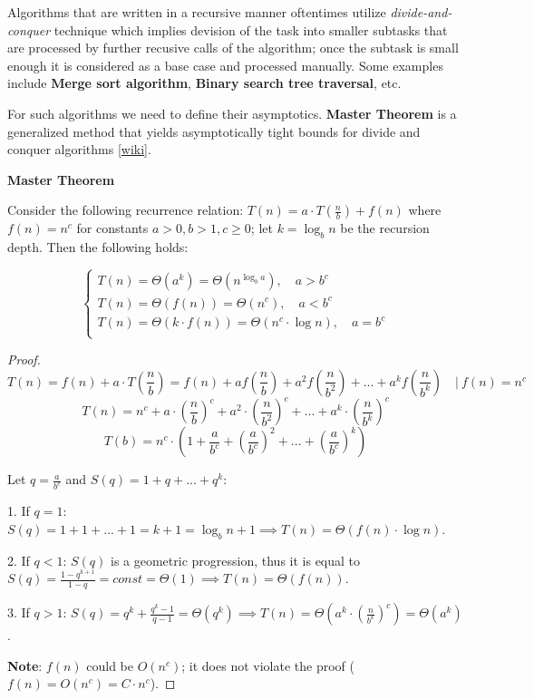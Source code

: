 
Algorithms that are written in a recursive manner oftentimes utilize \textit{divide-and-conquer} technique which implies devision of the task into smaller subtasks that are processed by further recusive calls of the algorithm; once the subtask is small enough it is considered as a base case and processed manually. Some examples include \textbf{Merge sort algorithm}, \textbf{Binary search tree traversal}, etc.

For such algorithms we need to define their asymptotics. \textbf{Master Theorem} is a generalized method that yields asymptotically tight bounds for divide and conquer algorithms [\href{https://en.wikipedia.org/wiki/Master_theorem_(analysis_of_algorithms)#Generic_form}{wiki}].

\begin{theorem}
    \textbf{Master Theorem}

    Consider the following recurrence relation: $T(n) = a \cdot T(\frac{n}{b}) + f(n)$ where $f(n) = n^c$ for constants $a > 0, b > 1, c \geq 0$; let $k = \log_{b}{n}$ be the recursion depth. Then the following holds:

    \begin{equation}
        \begin{cases}
            T(n) = \Theta(a^k) = \Theta(n^{\log_{b}{a}}), \quad a > b^c\\
            T(n) = \Theta(f(n)) = \Theta(n^c), \quad a < b^c\\
            T(n) = \Theta(k \cdot f(n)) = \Theta(n^c \cdot \log{n}), \quad a = b^c\\
        \end{cases}
    \end{equation}

\end{theorem}



\begin{proof}

    $$ T(n) = f(n) + a \cdot T(\frac{n}{b}) = f(n) + a f(\frac{n}{b}) + a^2 f(\frac{n}{b^2}) + ... + a^k f(\frac{n}{b^k}) \quad | \ f(n)=n^c$$
    $$ T(n) = n^c + a\cdot (\frac{n}{b})^c + a^2\cdot (\frac{n}{b^2})^c + ... + a^k\cdot (\frac{n}{b^k})^c $$
    $$ T(b) = n^c \cdot (1 + \frac{a}{b^c} + (\frac{a}{b^c})^2 + ... + (\frac{a}{b^c})^k) $$

    Let $q = \frac{a}{b^c}$ and $S(q) = 1 + q + ... + q^k$:

    1. If $q=1$: $S(q) = 1 + 1 + ... + 1 = k+1 = \log_{b}{n} + 1 \implies T(n) = \Theta(f(n) \cdot \log{n})$.

    2. If $q<1$: $S(q)$ is a geometric progression, thus it is equal to $S(q) = \frac{1-q^{k+1}}{1-q} = const = \Theta(1) \implies T(n) = \Theta(f(n))$.

    3. If $q>1$: $S(q) = q^k + \frac{q^k-1}{q-1} = \Theta(q^k) \implies T(n) = \Theta(a^k \cdot (\frac{n}{b^k})^c) = \Theta(a^k)$.

    \textbf{Note}: $f(n)$ could be $O(n^c)$; it does not violate the proof ($f(n) = O(n^c) = C \cdot n^c$).

\end{proof}


